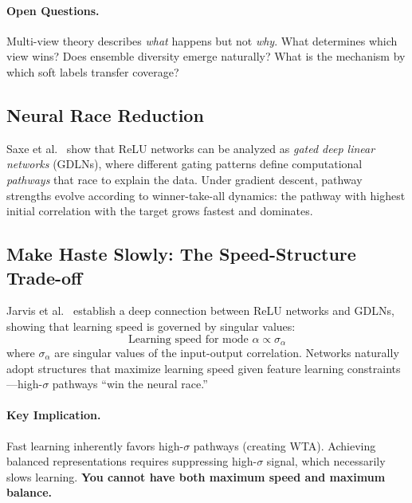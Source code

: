 \documentclass{article}
\begin{document}
\paragraph{Open Questions.} Multi-view theory describes \textit{what} happens but not \textit{why}. What determines which view wins? Does ensemble diversity emerge naturally? What is the mechanism by which soft labels transfer coverage?

\subsection{Neural Race Reduction}
\label{sec:race_background}

Saxe et al.~\cite{saxe2022neural} show that ReLU networks can be analyzed as \emph{gated deep linear networks} (GDLNs), where different gating patterns define computational \emph{pathways} that race to explain the data. Under gradient descent, pathway strengths evolve according to winner-take-all dynamics: the pathway with highest initial correlation with the target grows fastest and dominates.

\subsection{Make Haste Slowly: The Speed-Structure Trade-off}
\label{sec:makehaste}

Jarvis et al.~\cite{jarvis2025makehaste} establish a deep connection between ReLU networks and GDLNs, showing that learning speed is governed by singular values:
\begin{equation}
    \text{Learning speed for mode } \alpha \propto \sigma_\alpha
\end{equation}
where $\sigma_\alpha$ are singular values of the input-output correlation. Networks naturally adopt structures that maximize learning speed given feature learning constraints---high-$\sigma$ pathways ``win the neural race.''

\paragraph{Key Implication.} Fast learning inherently favors high-$\sigma$ pathways (creating WTA). Achieving balanced representations requires suppressing high-$\sigma$ signal, which necessarily slows learning. \textbf{You cannot have both maximum speed and maximum balance.}

\end{document}
